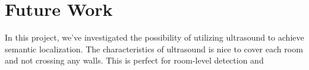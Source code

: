 
\section{Future Work}
\label{sec:future-work}

In this project, we've investigated the possibility of utilizing ultrasound to achieve semantic localization. The characteristics of ultrasound is nice to cover each room and not crossing any walls. This is perfect for room-level detection and 
